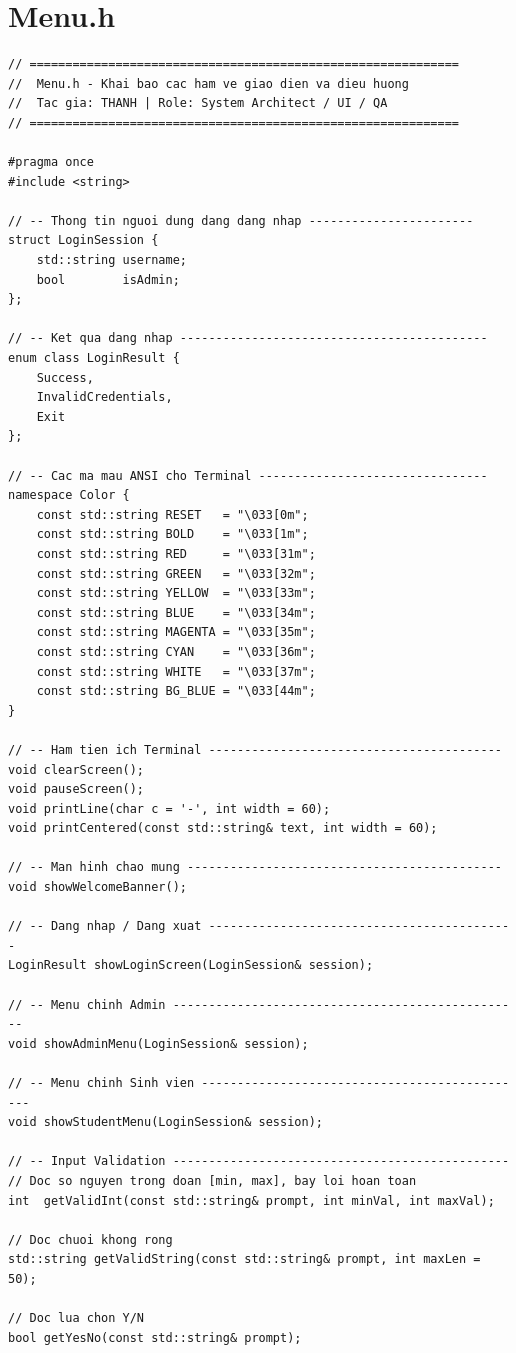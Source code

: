 \documentclass[11pt]{report}
\begin{document}
\section{Menu.h}

\begin{lstlisting}[caption={Menu.h -- Khai báo các hàm vẽ giao diện và điều hướng}, label={lst:full_menu_h}]
// ============================================================
//  Menu.h - Khai bao cac ham ve giao dien va dieu huong
//  Tac gia: THANH | Role: System Architect / UI / QA
// ============================================================

#pragma once
#include <string>

// -- Thong tin nguoi dung dang dang nhap -----------------------
struct LoginSession {
    std::string username;
    bool        isAdmin;
};

// -- Ket qua dang nhap -------------------------------------------
enum class LoginResult {
    Success,
    InvalidCredentials,
    Exit
};

// -- Cac ma mau ANSI cho Terminal --------------------------------
namespace Color {
    const std::string RESET   = "\033[0m";
    const std::string BOLD    = "\033[1m";
    const std::string RED     = "\033[31m";
    const std::string GREEN   = "\033[32m";
    const std::string YELLOW  = "\033[33m";
    const std::string BLUE    = "\033[34m";
    const std::string MAGENTA = "\033[35m";
    const std::string CYAN    = "\033[36m";
    const std::string WHITE   = "\033[37m";
    const std::string BG_BLUE = "\033[44m";
}

// -- Ham tien ich Terminal -----------------------------------------
void clearScreen();
void pauseScreen();
void printLine(char c = '-', int width = 60);
void printCentered(const std::string& text, int width = 60);

// -- Man hinh chao mung --------------------------------------------
void showWelcomeBanner();

// -- Dang nhap / Dang xuat -------------------------------------------
LoginResult showLoginScreen(LoginSession& session);

// -- Menu chinh Admin -------------------------------------------------
void showAdminMenu(LoginSession& session);

// -- Menu chinh Sinh vien ----------------------------------------------
void showStudentMenu(LoginSession& session);

// -- Input Validation -----------------------------------------------
// Doc so nguyen trong doan [min, max], bay loi hoan toan
int  getValidInt(const std::string& prompt, int minVal, int maxVal);

// Doc chuoi khong rong
std::string getValidString(const std::string& prompt, int maxLen = 50);

// Doc lua chon Y/N
bool getYesNo(const std::string& prompt);
\end{lstlisting}
\end{document}
